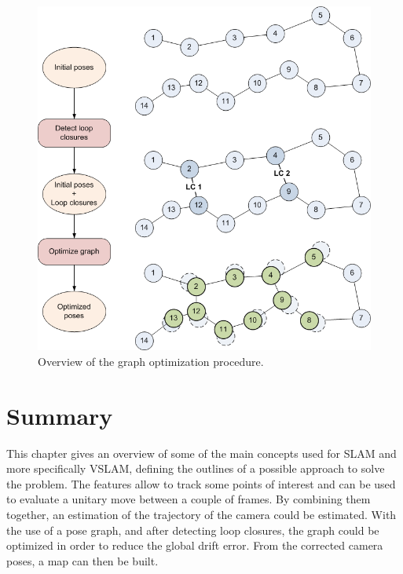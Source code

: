\begin{figure}[H]
\centering
\includegraphics[width=1\textwidth]{figures/graph_overview}
\caption{Overview of the graph optimization procedure. }
\label{fig:graph_overview}
\end{figure}

\clearpage
\section{Summary}

This chapter gives an overview of some of the main concepts used for \gls{SLAM} and more specifically \gls{VSLAM}, defining the outlines of a possible approach to solve the problem. The features allow to track some points of interest and can be used to evaluate a unitary move between a couple of frames. By combining them together, an estimation of the trajectory of the camera could be estimated. With the use of a pose graph, and after detecting loop closures, the graph could be optimized in order to reduce the global drift error. From the corrected camera poses, a map can then be built. 

